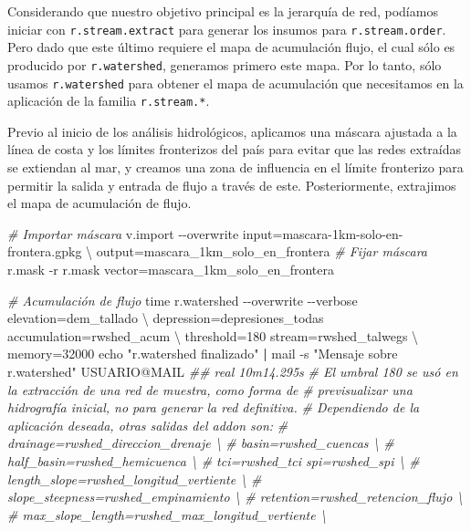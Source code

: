 \documentclass[spanish]{article}
\newenvironment{Shaded}{\begin{snugshade}}{\end{snugshade}}
\newcommand{\AttributeTok}[1]{\textcolor[rgb]{0.77,0.63,0.00}{#1}}
\newcommand{\BuiltInTok}[1]{#1}
\newcommand{\CommentTok}[1]{\textcolor[rgb]{0.56,0.35,0.01}{\textit{#1}}}
\newcommand{\DataTypeTok}[1]{\textcolor[rgb]{0.13,0.29,0.53}{#1}}
\newcommand{\ExtensionTok}[1]{#1}
\newcommand{\KeywordTok}[1]{\textcolor[rgb]{0.13,0.29,0.53}{\textbf{#1}}}
\newcommand{\NormalTok}[1]{#1}
\newcommand{\StringTok}[1]{\textcolor[rgb]{0.31,0.60,0.02}{#1}}
\begin{document}
Considerando que nuestro objetivo principal es la jerarquía de red,
podíamos iniciar con \texttt{r.stream.extract} para generar los insumos
para \texttt{r.stream.order}. Pero dado que este último requiere el mapa
de acumulación flujo, el cual sólo es producido por
\texttt{r.watershed}, generamos primero este mapa. Por lo tanto, sólo
usamos \texttt{r.watershed} para obtener el mapa de acumulación que
necesitamos en la aplicación de la familia \texttt{r.stream.*}.

Previo al inicio de los análisis hidrológicos, aplicamos una máscara
ajustada a la línea de costa y los límites fronterizos del país para
evitar que las redes extraídas se extiendan al mar, y creamos una zona
de influencia en el límite fronterizo para permitir la salida y entrada
de flujo a través de este. Posteriormente, extrajimos el mapa de
acumulación de flujo.

\begin{Shaded}
\begin{Highlighting}[]
\CommentTok{\# Importar máscara}
\ExtensionTok{v.import} \AttributeTok{{-}{-}overwrite}\NormalTok{ input=mascara{-}1km{-}solo{-}en{-}frontera.gpkg }\DataTypeTok{\textbackslash{}}
\NormalTok{  output=mascara\_1km\_solo\_en\_frontera}
\CommentTok{\# Fijar máscara}
\ExtensionTok{r.mask} \AttributeTok{{-}r}
\ExtensionTok{r.mask}\NormalTok{ vector=mascara\_1km\_solo\_en\_frontera}

\CommentTok{\# Acumulación de flujo}
\BuiltInTok{time}\NormalTok{ r.watershed }\AttributeTok{{-}{-}overwrite} \AttributeTok{{-}{-}verbose}\NormalTok{ elevation=dem\_tallado }\DataTypeTok{\textbackslash{}}
\NormalTok{ depression=depresiones\_todas accumulation=rwshed\_acum }\DataTypeTok{\textbackslash{}}
\NormalTok{ threshold=180 stream=rwshed\_talwegs }\DataTypeTok{\textbackslash{}}
\NormalTok{ memory=32000}
\BuiltInTok{echo} \StringTok{"r.watershed finalizado"} \KeywordTok{|} \ExtensionTok{mail} \AttributeTok{{-}s} \StringTok{"Mensaje sobre r.watershed"}\NormalTok{ USUARIO@MAIL}
\CommentTok{\#\# real 10m14.295s}
\CommentTok{\# El umbral 180 se usó en la extracción de una red de muestra, como forma de}
\CommentTok{\# previsualizar una hidrografía inicial, no para generar la red definitiva.}
\CommentTok{\# Dependiendo de la aplicación deseada, otras salidas del addon son:}
\CommentTok{\# drainage=rwshed\_direccion\_drenaje \textbackslash{}}
\CommentTok{\# basin=rwshed\_cuencas \textbackslash{}}
\CommentTok{\# half\_basin=rwshed\_hemicuenca \textbackslash{}}
\CommentTok{\# tci=rwshed\_tci spi=rwshed\_spi \textbackslash{}}
\CommentTok{\# length\_slope=rwshed\_longitud\_vertiente \textbackslash{}}
\CommentTok{\# slope\_steepness=rwshed\_empinamiento \textbackslash{}}
\CommentTok{\# retention=rwshed\_retencion\_flujo \textbackslash{}}
\CommentTok{\# max\_slope\_length=rwshed\_max\_longitud\_vertiente \textbackslash{}}
\end{Highlighting}
\end{Shaded}
\end{document}
